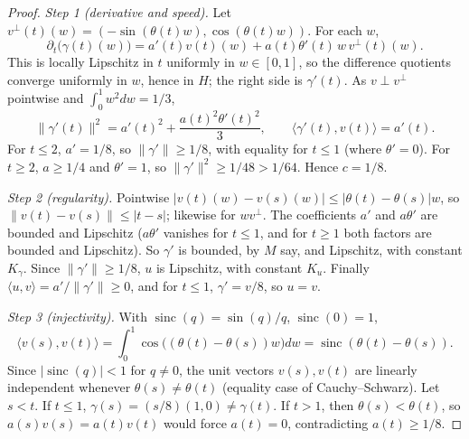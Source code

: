 \documentclass[11pt]{article}
\newcommand{\norm}[1]{\lVert #1\rVert}
\newcommand{\ip}[2]{\langle #1,#2\rangle}
\DeclareMathOperator{\sinc}{sinc}
\theoremstyle{definition}
\numberwithin{equation}{section}
\begin{document}
\begin{proof}
\emph{Step 1 (derivative and speed).} Let
$v^\perp(t)(w)=(-\sin(\theta(t)w),\cos(\theta(t)w))$. For each $w$,
\[
 \partial_t\bigl(\gamma(t)(w)\bigr)
 =a'(t)v(t)(w)+a(t)\theta'(t)\,w\,v^\perp(t)(w).
\]
This is locally Lipschitz in $t$ uniformly in $w\in[0,1]$, so the
difference quotients converge uniformly in $w$, hence in $H$; the right
side is $\gamma'(t)$. As $v\perp v^\perp$ pointwise and
$\int_0^1w^2dw=1/3$,
\[
 \norm{\gamma'(t)}^2=a'(t)^2+\frac{a(t)^2\theta'(t)^2}{3},
 \qquad\ip{\gamma'(t)}{v(t)}=a'(t).
\]
For $t\le2$, $a'=1/8$, so $\norm{\gamma'}\ge1/8$, with equality for
$t\le1$ (where $\theta'=0$). For $t\ge2$, $a\ge1/4$ and $\theta'=1$, so
$\norm{\gamma'}^2\ge1/48>1/64$. Hence $c=1/8$.

\emph{Step 2 (regularity).} Pointwise
$|v(t)(w)-v(s)(w)|\le|\theta(t)-\theta(s)|w$, so
$\norm{v(t)-v(s)}\le|t-s|$; likewise for $wv^\perp$. The coefficients
$a'$ and $a\theta'$ are bounded and Lipschitz ($a\theta'$ vanishes for
$t\le1$, and for $t\ge1$ both factors are bounded and Lipschitz). So
$\gamma'$ is bounded, by $M$ say, and Lipschitz, with constant
$K_\gamma$. Since $\norm{\gamma'}\ge1/8$, $u$ is Lipschitz, with
constant $K_u$. Finally $\ip uv=a'/\norm{\gamma'}\ge0$, and for $t\le1$,
$\gamma'=v/8$, so $u=v$.

\emph{Step 3 (injectivity).} With $\sinc(q)=\sin(q)/q$, $\sinc(0)=1$,
\[
 \ip{v(s)}{v(t)}=\int_0^1\cos\bigl((\theta(t)-\theta(s))w\bigr)dw
 =\sinc(\theta(t)-\theta(s)).
\]
Since $|\sinc(q)|<1$ for $q\ne0$, the unit vectors $v(s),v(t)$ are
linearly independent whenever $\theta(s)\ne\theta(t)$ (equality case of
Cauchy--Schwarz). Let $s<t$. If $t\le1$,
$\gamma(s)=(s/8)(1,0)\ne\gamma(t)$. If $t>1$, then
$\theta(s)<\theta(t)$, so $a(s)v(s)=a(t)v(t)$ would force $a(t)=0$,
contradicting $a(t)\ge1/8$.


\end{proof}
\end{document}
